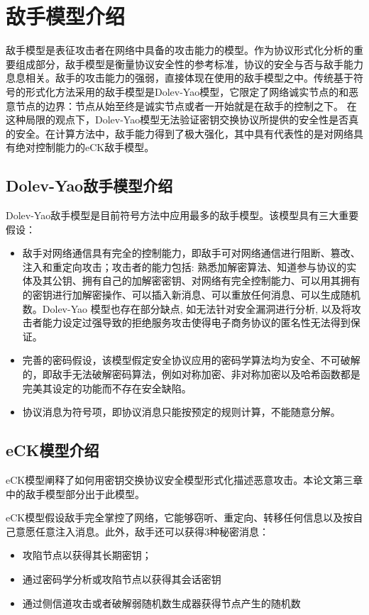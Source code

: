 \section{敌手模型介绍}
敌手模型是表征攻击者在网络中具备的攻击能力的模型。作为协议形式化分析的重要组成部分，敌手模型是衡量协议安全性的参考标准，协议的安全与否与敌手能力息息相关。敌手的攻击能力的强弱，直接体现在使用的敌手模型之中。传统基于符号的形式化方法采用的敌手模型是Dolev-Yao模型，它限定了网络诚实节点的和恶意节点的边界：节点从始至终是诚实节点或者一开始就是在敌手的控制之下。 在这种局限的观点下，Dolev-Yao模型无法验证密钥交换协议所提供的安全性是否真的安全。在计算方法中，敌手能力得到了极大强化，其中具有代表性的是对网络具有绝对控制能力的eCK敌手模型。%


\subsection{Dolev-Yao敌手模型介绍}

Dolev-Yao敌手模型是目前符号方法中应用最多的敌手模型。该模型具有三大重要假设：
\begin{itemize}
\item 敌手对网络通信具有完全的控制能力，即敌手可对网络通信进行阻断、篡改、注入和重定向攻击；攻击者的能力包括: 熟悉加解密算法、知道参与协议的实体及其公钥、拥有自己的加解密密钥、对网络有完全控制能力、可以用其拥有的密钥进行加解密操作、可以插入新消息、可以重放任何消息、可以生成随机数。Dolev-Yao 模型也存在部分缺点, 如无法针对安全漏洞进行分析, 以及将攻击者能力设定过强导致的拒绝服务攻击使得电子商务协议的匿名性无法得到保证。
\item 完善的密码假设，该模型假定安全协议应用的密码学算法均为安全、不可破解的，即敌手无法破解密码算法，例如对称加密、非对称加密以及哈希函数都是完美其设定的功能而不存在安全缺陷。
\item 协议消息为符号项，即协议消息只能按预定的规则计算，不能随意分解。
\end{itemize}

\subsection{eCK模型介绍}

eCK模型阐释了如何用密钥交换协议安全模型形式化描述恶意攻击\cite{LaMacchia2007}。本论文第三章中的敌手模型部分出于此模型。

eCK模型假设敌手完全掌控了网络，它能够窃听、重定向、转移任何信息以及按自己意愿任意注入消息。此外，敌手还可以获得3种秘密消息：
\begin{itemize}
\item 攻陷节点以获得其长期密钥；

\item 通过密码学分析或攻陷节点以获得其会话密钥

\item 通过侧信道攻击或者破解弱随机数生成器获得节点产生的随机数
\end{itemize}

